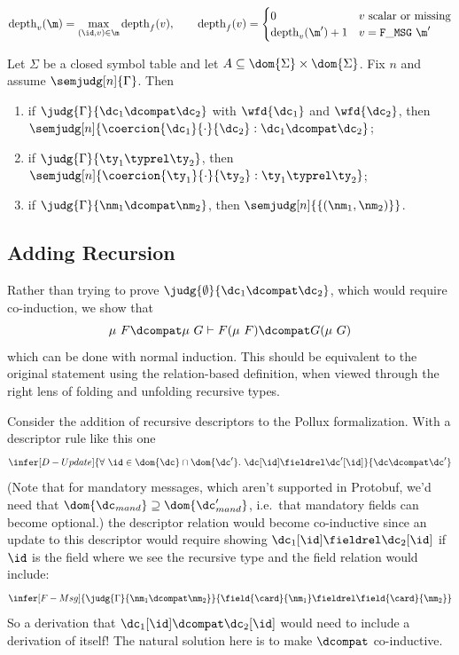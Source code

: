 \vspace{1em}
\begin{definition}\label{def:msg-depth}
\[ \mathrm{depth}_v(\m) = \max_{(\id,v) \in \m} \mathrm{depth}_f(v), \qquad
   \mathrm{depth}_f(v) = \begin{cases}
     0 & v \text{ scalar or missing} \\
     \mathrm{depth}_v(\m') + 1 & v = \mathtt{F\_MSG}\ \m'
   \end{cases} \]
\end{definition}

\vspace{1em}
\begin{theorem}\label{thm:fundamental}
  Let $\Sigma$ be a closed symbol table and let
  $A \subseteq \dom{\Sigma} \times \dom{\Sigma}$. Fix $n$ and assume
  $\semjudg[n]{\Gamma}$. Then
  \begin{enumerate}
    \item if $\judg{\Gamma}{\dc_1 \dcompat \dc_2}$ with $\wfd{\dc_1}$ and
      $\wfd{\dc_2}$, then
      $\semjudg[n]{\coercion{\dc_1}{\cdot}{\dc_2} : \dc_1 \dcompat \dc_2}$;
    \item if $\judg{\Gamma}{\ty_1 \typrel \ty_2}$, then
      $\semjudg[n]{\coercion{\ty_1}{\cdot}{\ty_2} : \ty_1 \typrel \ty_2}$;
    \item if $\judg{\Gamma}{\nm_1 \dcompat \nm_2}$, then $\semjudg[n]{\{(\nm_1, \nm_2)\}}$.
  \end{enumerate}
\end{theorem}

\subsection{Adding Recursion}\label{sec:recursive-types}

Rather than trying to prove
$\judg{\emptyset}{\dc_1 \dcompat \dc_2}$, which would require co-induction, we show that
\[ \mu\ F \dcompat \mu\ G \vdash F (\mu\ F) \dcompat G (\mu\ G) \]
which can be done with normal induction. This should be equivalent to the
original statement using the relation-based definition, when viewed through the
right lens of folding and unfolding recursive types.

Consider the addition of recursive descriptors to the Pollux formalization. With
a descriptor rule like this one
\[
  \infer[D-Update]{ \forall\ \id \in \dom{\dc} \cap \dom{\dc'}.\ \dc[\id] \fieldrel \dc'[\id] }{ \dc \dcompat \dc' }
\]
(Note that for mandatory messages, which aren't supported in Protobuf, we'd need
that $\dom{\dc_{mand}} \supseteq \dom{\dc_{mand}'}$, i.e.\ that mandatory fields can
become optional.) the descriptor relation would become co-inductive since an
update to this descriptor would require showing $\dc_1[\id] \fieldrel \dc_2[\id]$ if
$\id$ is the field where we see the recursive type and the field relation would
include:
\[ \infer[F-Msg]{ \judg{\Gamma}{\nm_1 \dcompat \nm_2 } }{ \field{\card}{\nm_1} \fieldrel \field{\card}{\nm_2} } \]
So a derivation that $\dc_1[\id] \dcompat \dc_2[\id]$ would need to include a derivation of
itself! The natural solution here is to make $\dcompat$ co-inductive. 

